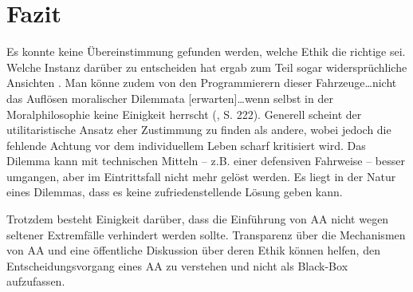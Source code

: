 \documentclass[a4paper, 12pt, titlepage]{scrartcl}
\begin{document}
\section{Fazit}
	Es konnte keine \"Ubereinstimmung gefunden werden, welche Ethik die \glqq richtige\grqq{} sei. Welche Instanz dar\"uber zu entscheiden hat ergab zum Teil sogar widerspr\"uchliche Ansichten \autocite{Gogoll2016,Hevelke2015}. Man k\"onne zudem von \glqq den Programmierern dieser Fahrzeuge\dots nicht das Auflösen moralischer Dilemmata [erwarten]\dots wenn selbst in der Moralphilosophie keine Einigkeit herrscht\grqq{} (\autocite{Scholz2016}, S. 222). Generell scheint der utilitaristische Ansatz eher Zustimmung zu finden als andere, wobei jedoch die fehlende Achtung vor dem individuellem Leben scharf kritisiert wird. Das Dilemma kann mit technischen Mitteln -- z.B. einer defensiven Fahrweise -- besser umgangen, aber im Eintrittsfall nicht mehr gel\"ost werden. Es liegt in der Natur eines Dilemmas, dass es keine zufriedenstellende L\"osung geben kann. 
	
	Trotzdem besteht Einigkeit dar\"uber, dass die Einf\"uhrung von AA nicht wegen seltener Extremf\"alle verhindert werden sollte. Transparenz \"uber die Mechanismen von AA und eine \"offentliche Diskussion \"uber deren Ethik k\"onnen helfen, den Entscheidungsvorgang eines AA zu verstehen und nicht als \glqq Black-Box\grqq{} aufzufassen. 
 


\newpage
\printbibliography
\end{document}
